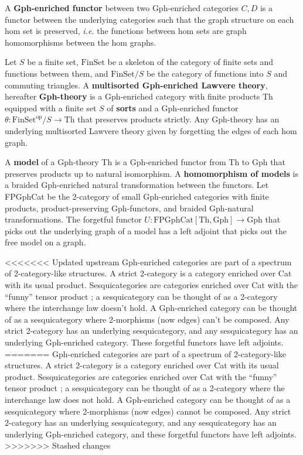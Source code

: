 \documentclass[a4paper,UKenglish]{lipics-v2016}
\newcommand{\maps}{\colon}
\newcommand{\Th}{\mathrm{Th}}
\newcommand{\Gph}{\mathrm{Gph}}
\newcommand{\FinSet}{\mathrm{FinSet}}
\newcommand{\FPGphCat}{\mathrm{FPGphCat}}
\newcommand{\op}{\mathrm{op}}
\begin{document}
A {\bf Gph-enriched functor} between two Gph-enriched categories $C, D$ is a functor between the underlying categories such that the graph structure on each hom set is preserved, {\em i.e.} the functions between hom sets are graph homomorphisms between the hom graphs.

Let $S$ be a finite set, $\FinSet$ be a skeleton of the category of finite sets and functions between them, and $\FinSet/S$ be the category of functions into $S$ and commuting triangles.  A {\bf multisorted Gph-enriched Lawvere theory}, hereafter {\bf Gph-theory} is a Gph-enriched category with finite products Th equipped with a finite set $S$ of {\bf sorts} and a Gph-enriched functor $\theta\maps \FinSet^{\op}/S \to \Th$ that preserves products strictly.  Any Gph-theory has an underlying multisorted Lawvere theory given by forgetting the edges of each hom graph.

A {\bf model} of a Gph-theory Th is a Gph-enriched functor from Th to Gph that preserves products up to natural isomorphism.  A {\bf homomorphism of models} is a braided Gph-enriched natural transformation between the functors.  Let FPGphCat be the 2-category of small Gph-enriched categories with finite products, product-preserving Gph-functors, and braided Gph-natural transformations.  The forgetful functor $U\maps \FPGphCat[\Th, \Gph] \to \Gph$ that picks out the underlying graph of a model has a left adjoint that picks out the free model on a graph.

<<<<<<< Updated upstream
Gph-enriched categories are part of a spectrum of 2-category-like structures.  A strict 2-category is a category enriched over Cat with its usual product.  Sesquicategories are categories enriched over Cat with the ``funny'' tensor product \cite{Lack2010}; a sesquicategory can be thought of as a 2-category where the interchange law doesn't hold.  A Gph-enriched category can be thought of as a sesquicategory where 2-morphisms (now edges) can't be composed.  Any strict 2-category has an underlying sesquicategory, and any sesquicategory has an underlying Gph-enriched category.  These forgetful functors have left adjoints.
=======
Gph-enriched categories are part of a spectrum of 2-category-like structures.  A strict 2-category is a category enriched over Cat with its usual product.  Sesquicategories are categories enriched over Cat with the ``funny'' tensor product \cite{Lack2CategoriesCompanion}; a sesquicategory can be thought of as a 2-category where the interchange law does not hold.  A Gph-enriched category can be thought of as a sesquicategory where 2-morphisms (now edges) cannot be composed.  Any strict 2-category has an underlying sesquicategory, and any sesquicategory has an underlying Gph-enriched category, and these forgetful functors have left adjoints.
>>>>>>> Stashed changes
\end{document}
